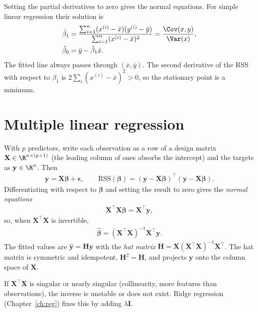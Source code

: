 \documentclass[a4paper, 12pt]{book}
\begin{document}
Setting the partial derivatives to zero gives the normal equations. For simple
linear regression their solution is
\begin{align}
    \hat{\beta}_1
    &= \frac{\sum_{i=1}^n (x^{(i)} - \bar{x})(y^{(i)} - \bar{y})}
              {\sum_{i=1}^n (x^{(i)} - \bar{x})^2}
    = \frac{\Cov(x,y)}{\Var(x)},\\
    \hat{\beta}_0 &= \bar{y} - \hat{\beta}_1 \bar{x}.
\end{align}
The fitted line always passes through $(\bar{x},\bar{y})$. The second derivative of
the RSS with respect to $\beta_1$ is $2\sum_i (x^{(i)}-\bar{x})^2 > 0$, so the
stationary point is a minimum.

\section{Multiple linear regression}

With $p$ predictors, write each observation as a row of a design matrix
$\mathbf{X} \in \R^{n \times (p+1)}$ (the leading column of ones absorbs the
intercept) and the targets as $\mathbf{y} \in \R^n$. Then
\begin{align}
    \mathbf{y} = \mathbf{X}\boldsymbol{\beta} + \boldsymbol{\epsilon},
    \qquad
    \mathrm{RSS}(\boldsymbol{\beta})
    = (\mathbf{y} - \mathbf{X}\boldsymbol{\beta})^\top
      (\mathbf{y} - \mathbf{X}\boldsymbol{\beta}).
\end{align}
Differentiating with respect to $\boldsymbol{\beta}$ and setting the result to zero
gives the \emph{normal equations}
\begin{align}
    \mathbf{X}^\top\mathbf{X}\boldsymbol{\beta}
    = \mathbf{X}^\top\mathbf{y},
\end{align}
so, when $\mathbf{X}^\top\mathbf{X}$ is invertible,
\begin{align}
    \hat{\boldsymbol{\beta}}
    = (\mathbf{X}^\top\mathbf{X})^{-1}\mathbf{X}^\top\mathbf{y}.
\end{align}
The fitted values are $\hat{\mathbf{y}} = \mathbf{H}\mathbf{y}$ with the \emph{hat
matrix} $\mathbf{H} = \mathbf{X}(\mathbf{X}^\top\mathbf{X})^{-1}\mathbf{X}^\top$.
The hat matrix is symmetric and idempotent, $\mathbf{H}^2=\mathbf{H}$, and projects
$\mathbf{y}$ onto the column space of $\mathbf{X}$.

If $\mathbf{X}^\top\mathbf{X}$ is singular or nearly singular (collinearity, more
features than observations), the inverse is unstable or does not exist. Ridge
regression (Chapter~\ref{ch:reg}) fixes this by adding $\lambda\mathbf{I}$.
\end{document}
